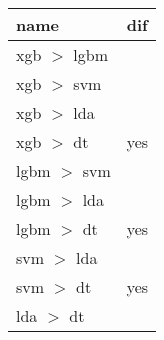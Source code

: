 \begin{tabular}{ll}
  \toprule
{\bfseries name} & {\bfseries dif} \\ 
  \midrule
xgb $>$ lgbm &   \\ 
  xgb $>$ svm &   \\ 
  xgb $>$ lda &   \\ 
  xgb $>$ dt & yes \\ 
  lgbm $>$ svm &   \\ 
  lgbm $>$ lda &   \\ 
  lgbm $>$ dt & yes \\ 
  svm $>$ lda &   \\ 
  svm $>$ dt & yes \\ 
  lda $>$ dt &   \\ 
   \bottomrule
\end{tabular}
